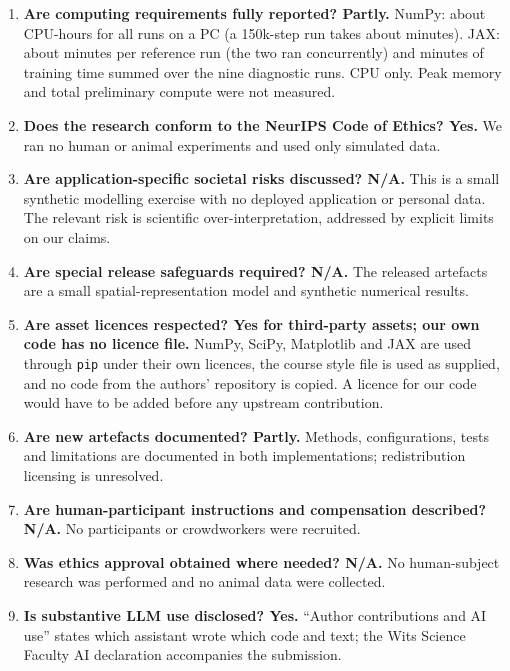 \begin{enumerate}[leftmargin=1.6em,itemsep=2pt]
\item \textbf{Are computing requirements fully reported? Partly.} NumPy: about \xCpuHours{} CPU-hours for all \nJobs{} runs on a PC (a 150k-step run takes about \trainMinLong{} minutes). JAX: about \jRefMinutes{} minutes per reference run (the two ran concurrently) and \jDiagMinutes{} minutes of training time summed over the nine diagnostic runs. CPU only. Peak memory and total preliminary compute were not measured.
\item \textbf{Does the research conform to the NeurIPS Code of Ethics? Yes.} We ran no human or animal experiments and used only simulated data.
\item \textbf{Are application-specific societal risks discussed? N/A.} This is a small synthetic modelling exercise with no deployed application or personal data. The relevant risk is scientific over-interpretation, addressed by explicit limits on our claims.
\item \textbf{Are special release safeguards required? N/A.} The released artefacts are a small spatial-representation model and synthetic numerical results.
\item \textbf{Are asset licences respected? Yes for third-party assets; our own code has no licence file.} NumPy, SciPy, Matplotlib and JAX are used through \texttt{pip} under their own licences, the course style file is used as supplied, and no code from the authors' repository is copied. A licence for our code would have to be added before any upstream contribution.
\item \textbf{Are new artefacts documented? Partly.} Methods, configurations, tests and limitations are documented in both implementations; redistribution licensing is unresolved.
\item \textbf{Are human-participant instructions and compensation described? N/A.} No participants or crowdworkers were recruited.
\item \textbf{Was ethics approval obtained where needed? N/A.} No human-subject research was performed and no animal data were collected.
\item \textbf{Is substantive LLM use disclosed? Yes.} ``Author contributions and AI use'' states which assistant wrote which code and text; the Wits Science Faculty AI declaration accompanies the submission.
\end{enumerate}
